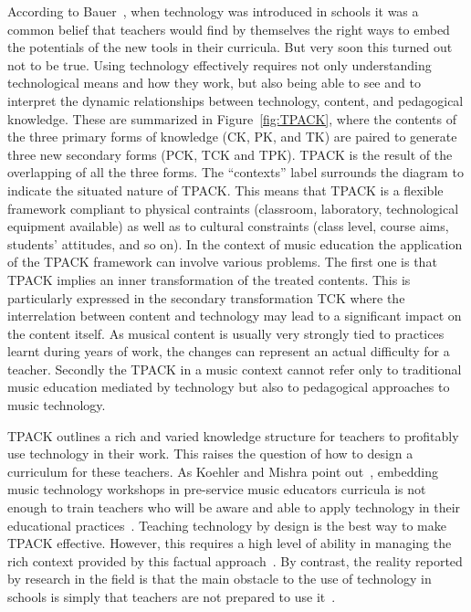 \documentclass[journal]{IEEEtran}
\begin{document}
According to Bauer~\cite{bauer2014music}, when technology was introduced in schools it was a common belief that teachers would find by themselves the right ways to embed the potentials of the new tools in their curricula. But very soon this turned out not to be true. Using technology effectively requires not only understanding technological means and how they work, but also being able to see and to interpret the dynamic relationships between technology, content, and pedagogical knowledge. These are summarized in Figure~\ref{fig:TPACK}, where the contents of the three primary forms of knowledge (CK, PK, and TK) are paired to generate three new secondary forms (PCK, TCK and TPK).
TPACK is the result of the overlapping of all the three forms. 
The ``contexts'' label surrounds the diagram to indicate the situated nature of TPACK. This means that TPACK is a flexible framework compliant to physical contraints (classroom, laboratory, technological equipment available) as well as to cultural constraints (class level, course aims, students' attitudes, and so on). {\color{blue} In the context of music education the application of the TPACK framework can involve various problems. The first one is that TPACK implies an inner transformation of the treated contents. This is particularly expressed in the secondary transformation TCK where the interrelation between content and technology may lead to a significant impact on the content itself. As musical content is usually very strongly tied to practices learnt during years of work, the changes  can represent an actual difficulty for a teacher. Secondly the TPACK in a music context cannot refer only to traditional music education mediated by technology but also to pedagogical approaches to music technology.     }


TPACK outlines a rich and varied knowledge structure for teachers to profitably use technology in their work. This raises the question of how to design a curriculum for these teachers.
As Koehler and Mishra point out~\cite{koehler2005happens}, embedding music technology workshops in pre-service music educators curricula is not enough to train teachers who will be aware and able to apply technology in their educational practices~\cite{brand1998research, duran2006technology, haning2016they}. 
Teaching technology by design is the best way to make TPACK effective. However, this requires a high level of ability in managing the rich context provided by this factual approach~\cite{koehler2009technological}. By contrast, the reality reported by research in the field is that the main obstacle to the use of technology in schools is simply that teachers are not prepared to use it~\cite{dorfman2016exploring}. 
\end{document}
